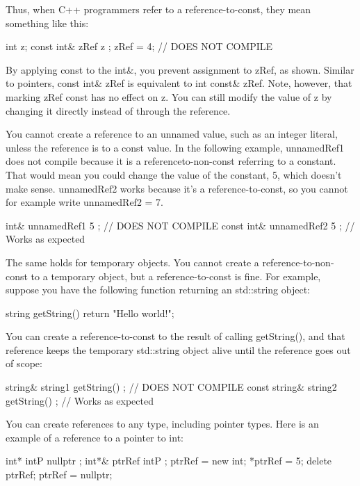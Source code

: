 Thus, when C++ programmers refer to a reference-to-const, they mean something like this:

\begin{cpp}
int z;
const int& zRef { z };
zRef = 4; // DOES NOT COMPILE
\end{cpp}

By applying const to the int\&, you prevent assignment to zRef, as shown. Similar to pointers, const int\& zRef is equivalent to int const\& zRef. Note, however, that marking zRef const has no effect on z. You can still modify the value of z by changing it directly instead of through the reference.

You cannot create a reference to an unnamed value, such as an integer literal, unless the reference is to a const value. In the following example, unnamedRef1 does not compile because it is a referenceto-non-const referring to a constant. That would mean you could change the value of the constant, 5, which doesn’t make sense. unnamedRef2 works because it’s a reference-to-const, so you cannot for example write unnamedRef2 = 7.

\begin{cpp}
int& unnamedRef1 { 5 }; // DOES NOT COMPILE
const int& unnamedRef2 { 5 }; // Works as expected
\end{cpp}

The same holds for temporary objects. You cannot create a reference-to-non-const to a temporary object, but a reference-to-const is fine. For example, suppose you have the following function returning an std::string object:

\begin{cpp}
string getString() { return "Hello world!"; }
\end{cpp}

You can create a reference-to-const to the result of calling getString(), and that reference keeps the temporary std::string object alive until the reference goes out of scope:

\begin{cpp}
string& string1 { getString() }; // DOES NOT COMPILE
const string& string2 { getString() }; // Works as expected
\end{cpp}


You can create references to any type, including pointer types. Here is an example of a reference to a pointer to int:

\begin{cpp}
int* intP { nullptr };
int*& ptrRef { intP };
ptrRef = new int;
*ptrRef = 5;
delete ptrRef; ptrRef = nullptr;
\end{cpp}

